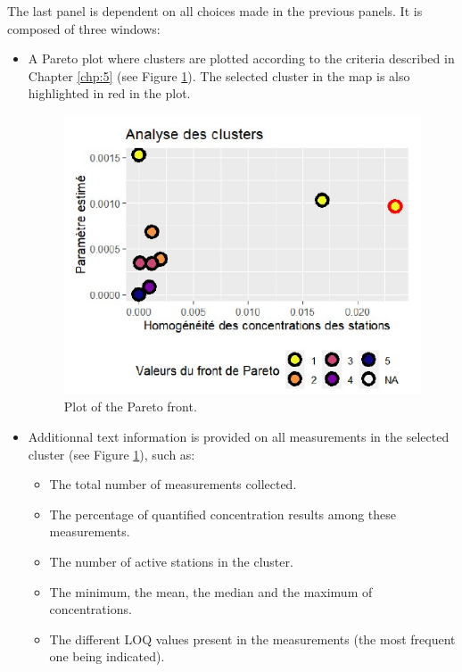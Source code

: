 The last panel is dependent on all choices made in the previous panels. It is composed of three windows:   
\begin{itemize}
\item A Pareto plot where clusters are plotted according to the criteria described in Chapter \ref{chp:5} (see Figure \ref{fig:Imapp8}). The selected cluster in the map is also highlighted in red in the plot.
\begin{figure}[htbp]
 \centering
 \includegraphics[]{figs/Chap6/Im_appbis8.pdf}
 \caption{Plot of the Pareto front.}
 \label{fig:Imapp8}
\end{figure}
\item Additionnal text information is provided on all measurements in the selected cluster (see Figure \ref{fig:Imapp8}), such as:
\begin{itemize}
\item The total number of measurements collected.
\item The percentage of quantified concentration results among these measurements.
\item The number of active stations in the cluster.
\item The minimum, the mean, the median and the maximum of concentrations.
\item The different LOQ values present in the measurements (the most frequent one being indicated).

\end{itemize}
\end{itemize}
